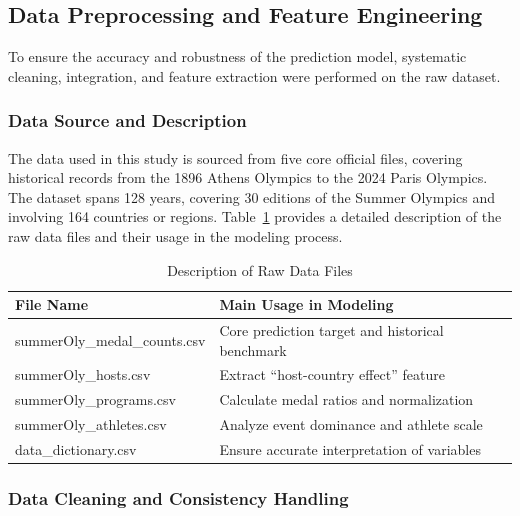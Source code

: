 \documentclass{mcmthesis}
\begin{document}
\subsection{Data Preprocessing and Feature Engineering}

To ensure the accuracy and robustness of the prediction model, systematic cleaning, integration, and feature extraction were performed on the raw dataset.

\subsubsection{Data Source and Description}

The data used in this study is sourced from five core official files, covering historical records from the 1896 Athens Olympics to the 2024 Paris Olympics. The dataset spans 128 years, covering 30 editions of the Summer Olympics and involving 164 countries or regions. Table~\ref{tab:raw_data_files} provides a detailed description of the raw data files and their usage in the modeling process.

\begin{table}[htbp]
\centering
\caption{Description of Raw Data Files}
\label{tab:raw_data_files}
\begin{tabular}{
>{\raggedright\arraybackslash\footnotesize\ttfamily}p{6cm}
>{\raggedright\arraybackslash}p{9.7cm}
}
\toprule
\textbf{File Name} & \textbf{Main Usage in Modeling} \\
\midrule
summerOly\_medal\_counts.csv
& Core prediction target and historical benchmark \\

summerOly\_hosts.csv
& Extract ``host-country effect'' feature \\

summerOly\_programs.csv
& Calculate medal ratios and normalization \\

summerOly\_athletes.csv
& Analyze event dominance and athlete scale \\

data\_dictionary.csv
& Ensure accurate interpretation of variables \\
\bottomrule
\end{tabular}
\end{table}


\subsubsection{Data Cleaning and Consistency Handling}
\end{document}
